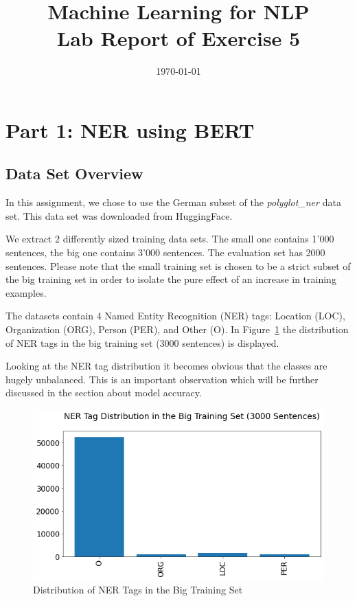 \documentclass{article}
\title{Machine Learning for NLP \\ Lab Report of Exercise 5}
\date{\today}
\begin{document}
\maketitle

\section{Part 1: NER using BERT}
\subsection{Data Set Overview}
\label{data_inspection}

In this assignment, we chose to use the German subset of the \textit{polyglot\_ner} data set. This data set was downloaded from HuggingFace.

We extract 2 differently sized training data sets. The small one contains 1'000 sentences, the big one contains 3'000 sentences. The evaluation set has 2000 sentences. Please note that the small training set is chosen to be a strict subset of the big training set in order to isolate the pure effect of an increase in training examples.

The datasets contain 4 Named Entity Recognition (NER) tags: Location (LOC), Organization (ORG), Person (PER), and Other (O). In Figure~\ref{fig:ner_tag_dist} the distribution of NER tags in the big training set (3000 sentences) is displayed.

Looking at the NER tag distribution it becomes obvious that the classes are hugely unbalanced. This is an important observation which will be further discussed in the section about model accuracy.

\begin{figure}[h!]
    \centering
    \includegraphics[scale=0.5]{ner_tag_dist.png}
    \caption{Distribution of NER Tags in the Big Training Set}
    \label{fig:ner_tag_dist}
\end{figure}
\end{document}
